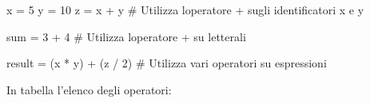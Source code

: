 \documentclass[
  letterpaper,
  DIV=11,
  numbers=noendperiod]{scrreprt}
\newenvironment{Shaded}{\begin{snugshade}}{\end{snugshade}}
\newcommand{\BuiltInTok}[1]{\textcolor[rgb]{0.00,0.23,0.31}{#1}}
\newcommand{\CommentTok}[1]{\textcolor[rgb]{0.37,0.37,0.37}{#1}}
\newcommand{\DecValTok}[1]{\textcolor[rgb]{0.68,0.00,0.00}{#1}}
\newcommand{\NormalTok}[1]{\textcolor[rgb]{0.00,0.23,0.31}{#1}}
\newcommand{\OperatorTok}[1]{\textcolor[rgb]{0.37,0.37,0.37}{#1}}
\begin{document}
\begin{Shaded}
\begin{Highlighting}[]
\NormalTok{x }\OperatorTok{=} \DecValTok{5}
\NormalTok{y }\OperatorTok{=} \DecValTok{10}
\NormalTok{z }\OperatorTok{=}\NormalTok{ x }\OperatorTok{+}\NormalTok{ y }\CommentTok{\# Utilizza l\textquotesingle{}operatore + sugli identificatori x e y}

\BuiltInTok{sum} \OperatorTok{=} \DecValTok{3} \OperatorTok{+} \DecValTok{4} \CommentTok{\# Utilizza l\textquotesingle{}operatore + su letterali}

\NormalTok{result }\OperatorTok{=}\NormalTok{ (x }\OperatorTok{*}\NormalTok{ y) }\OperatorTok{+}\NormalTok{ (z }\OperatorTok{/} \DecValTok{2}\NormalTok{) }\CommentTok{\# Utilizza vari operatori su espressioni}
\end{Highlighting}
\end{Shaded}

In tabella l'elenco degli operatori:
\end{document}
